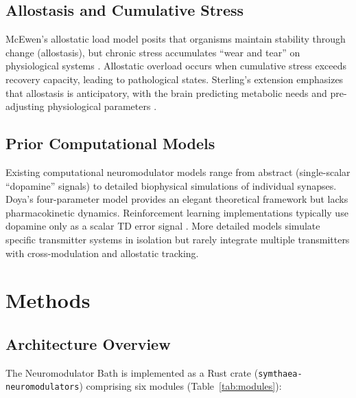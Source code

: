 \documentclass[11pt,a4paper]{article}
\begin{document}
\subsection{Allostasis and Cumulative Stress}

McEwen's allostatic load model posits that organisms maintain stability through change (allostasis), but chronic stress accumulates ``wear and tear'' on physiological systems \citep{mcewen1998}. Allostatic overload occurs when cumulative stress exceeds recovery capacity, leading to pathological states. Sterling's extension emphasizes that allostasis is anticipatory, with the brain predicting metabolic needs and pre-adjusting physiological parameters \citep{sterling2012}.

\subsection{Prior Computational Models}

Existing computational neuromodulator models range from abstract (single-scalar ``dopamine'' signals) to detailed biophysical simulations of individual synapses. Doya's four-parameter model \citep{doya2002} provides an elegant theoretical framework but lacks pharmacokinetic dynamics. Reinforcement learning implementations typically use dopamine only as a scalar TD error signal \citep{sutton1998}. More detailed models simulate specific transmitter systems in isolation \citep{humphries2009} but rarely integrate multiple transmitters with cross-modulation and allostatic tracking.

\section{Methods}

\subsection{Architecture Overview}

The Neuromodulator Bath is implemented as a Rust crate (\texttt{symthaea-neuromodulators}) comprising six modules (Table~\ref{tab:modules}):
\end{document}
